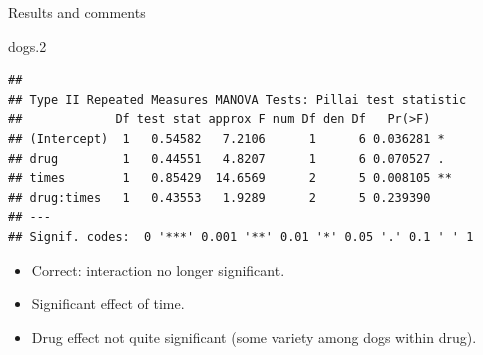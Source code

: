\documentclass[
  ignorenonframetext,
]{beamer}
\newenvironment{Shaded}{\begin{snugshade}}{\end{snugshade}}
\newcommand{\FloatTok}[1]{\textcolor[rgb]{0.00,0.00,0.81}{#1}}
\newcommand{\NormalTok}[1]{#1}
\begin{document}
\begin{frame}[fragile]{Results and comments}
\protect\hypertarget{results-and-comments}{}

\footnotesize

\begin{Shaded}
\begin{Highlighting}[]
\NormalTok{dogs}\FloatTok{.2}
\end{Highlighting}
\end{Shaded}

\begin{verbatim}
## 
## Type II Repeated Measures MANOVA Tests: Pillai test statistic
##             Df test stat approx F num Df den Df   Pr(>F)   
## (Intercept)  1   0.54582   7.2106      1      6 0.036281 * 
## drug         1   0.44551   4.8207      1      6 0.070527 . 
## times        1   0.85429  14.6569      2      5 0.008105 **
## drug:times   1   0.43553   1.9289      2      5 0.239390   
## ---
## Signif. codes:  0 '***' 0.001 '**' 0.01 '*' 0.05 '.' 0.1 ' ' 1
\end{verbatim}

\normalsize

\begin{itemize}
\item
  Correct: interaction no longer significant.
\item
  Significant effect of time.
\item
  Drug effect not quite significant (some variety among dogs within
  drug).
\end{itemize}

\end{frame}
\end{document}
